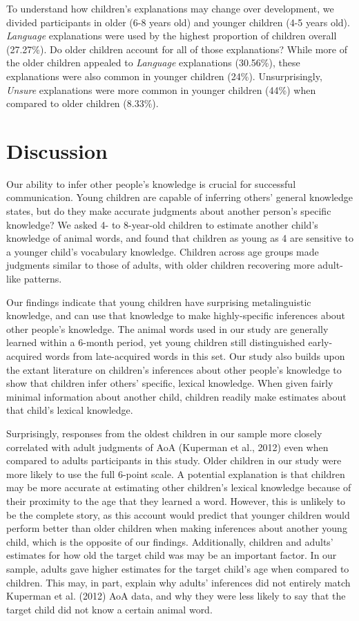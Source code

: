 \documentclass[10pt, letterpaper]{article}
\begin{document}
To understand how children's explanations may change over development,
we divided participants in older (6-8 years old) and younger children
(4-5 years old). \emph{Language} explanations were used by the highest
proportion of children overall (27.27\%). Do older children account for
all of those explanations? While more of the older children appealed to
\emph{Language} explanations (30.56\%), these explanations were also
common in younger children (24\%). Unsurprisingly, \emph{Unsure}
explanations were more common in younger children (44\%) when compared
to older children (8.33\%).

\hypertarget{discussion}{%
\section{Discussion}\label{discussion}}

Our ability to infer other people's knowledge is crucial for successful
communication. Young children are capable of inferring others' general
knowledge states, but do they make accurate judgments about another
person's specific knowledge? We asked 4- to 8-year-old children to
estimate another child's knowledge of animal words, and found that
children as young as 4 are sensitive to a younger child's vocabulary
knowledge. Children across age groups made judgments similar to those of
adults, with older children recovering more adult-like patterns.

Our findings indicate that young children have surprising metalinguistic
knowledge, and can use that knowledge to make highly-specific inferences
about other people's knowledge. The animal words used in our study are
generally learned within a 6-month period, yet young children still
distinguished early-acquired words from late-acquired words in this set.
Our study also builds upon the extant literature on children's
inferences about other people's knowledge to show that children infer
others' specific, lexical knowledge. When given fairly minimal
information about another child, children readily make estimates about
that child's lexical knowledge.

Surprisingly, responses from the oldest children in our sample more
closely correlated with adult judgments of AoA (Kuperman et al., 2012)
even when compared to adults participants in this study. Older children
in our study were more likely to use the full 6-point scale. A potential
explanation is that children may be more accurate at estimating other
children's lexical knowledge because of their proximity to the age that
they learned a word. However, this is unlikely to be the complete story,
as this account would predict that younger children would perform better
than older children when making inferences about another young child,
which is the opposite of our findings. Additionally, children and
adults' estimates for how old the target child was may be an important
factor. In our sample, adults gave higher estimates for the target
child's age when compared to children. This may, in part, explain why
adults' inferences did not entirely match Kuperman et al. (2012) AoA
data, and why they were less likely to say that the target child did not
know a certain animal word.
\end{document}
